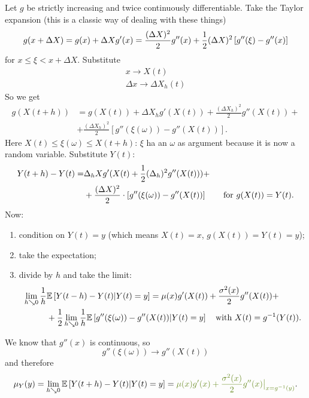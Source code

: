 \documentclass[12pt]{report}
\begin{document}
\begin{fancyproof}
	Let $g$ be strictly increasing and twice continuously differentiable. Take the Taylor expansion (this is a classic way of dealing with these things)
	\begin{equation*}
		g(x+\Delta X)=g(x)+\Delta Xg'(x)=\frac{(\Delta X)^{2}}{2}g''(x)+\frac{1}{2}(\Delta X)^{2}\left[g''(\xi)-g''(x)\right]
	\end{equation*}
	for $x\leq\xi<x+\Delta X$. Substitute 
	\begin{equation*}
		\begin{array}{c}
			x\to X(t)\\
			\Delta  x\to\Delta X_{h}(t)
		\end{array}
	\end{equation*}
	So we get 
	\begin{align*}
		g(X(t+h))&=g(X(t))+\Delta X_{h}g'(X(t))+\frac{(\Delta X_{h})^{2}}{2}g''(X(t))+\\
		&+\frac{(\Delta X_{h})^{2}}{2}\left[g''(\xi(\omega))-g''(X(t))\right].
	\end{align*}
	Here $X(t)\leq\xi(\omega)\leq X(t+h)$: $\xi$ ha an $\omega$ as argument because it is now a random variable. Substitute $Y(t)$:
	\begin{align*}
		Y(t+h)-Y(t)=&\Delta_{h} X g'(X(t)+\frac{1}{2}(\Delta_{h})^{2}g''(X(t)))+\\&+\frac{(\Delta X)^{2}}{2}\cdot\left[g''(\xi(\omega))-g''(X(t))\right]\qquad\text{for }g(X(t))=Y(t).
	\end{align*}
	Now:
	\begin{enumerate}
		\item condition on $Y(t)=y$ (which means $X(t)=x$, $g(X(t))=Y(t)=y$);
		\item take the expectation;
		\item divide by $h$ and take the limit:
		\begin{align*}
			\lim_{h\searrow0}\frac{1}{h}&\mathbb{E}\left[Y(t-h)-Y(t)|Y(t)=y\right]=\mu(x)g'(X(t))+\frac{\sigma^{2}(x)}{2}g''(X(t))+\\
			&+\frac{1}{2}\lim_{h\searrow0}\frac{1}{h}\mathbb{E}\left[g''(\xi(\omega))-g''(X(t))|Y(t)=y\right]\quad\text{with }X(t)=g^{-1}(Y(t)).
		\end{align*}
	\end{enumerate}
	We know that $g''(x)$ is continuous, so 
	\begin{equation*}
		g''(\xi(\omega))\to g''(X(t))
	\end{equation*}
	and therefore
	\begin{equation*}
		\mu_{Y}(y)=\lim_{h\searrow0}\ev{Y(t+h)-Y(t)|Y(t)=y}=\mathcolor{OliveDrab4}{\mu(x)g'(x)+\frac{\sigma^{2}(x)}{2}g''(x)\big|_{x=g^{-1}(y)}}.

\end{equation*}
\end{fancyproof}
\end{document}
